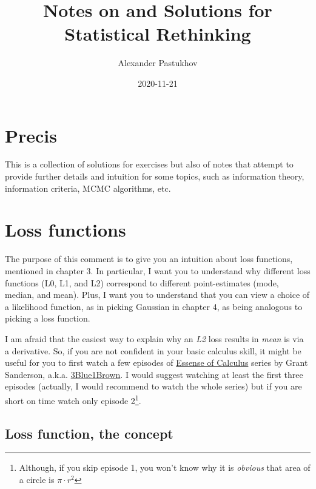 \documentclass[
]{book}
\title{Notes on and Solutions for Statistical Rethinking}
\author{Alexander Pastukhov}
\date{2020-11-21}
\begin{document}
\maketitle

{
\setcounter{tocdepth}{1}
\tableofcontents
}
\hypertarget{precis}{%
\chapter{Precis}\label{precis}}

This is a collection of solutions for exercises but also of notes that attempt to provide further details and intuition for some topics, such as information theory, information criteria, MCMC algorithms, etc.

\hypertarget{loss-functions}{%
\chapter{Loss functions}\label{loss-functions}}

The purpose of this comment is to give you an intuition about loss functions, mentioned in chapter 3. In particular, I want you to understand why different loss functions (L0, L1, and L2) correspond to different point-estimates (mode, median, and mean). Plus, I want you to understand that you can view a choice of a likelihood function, as in picking Gaussian in chapter 4, as being analogous to picking a loss function.

I am afraid that the easiest way to explain why an \emph{L2} loss results in \emph{mean} is via a derivative. So, if you are not confident in your basic calculus skill, it might be useful for you to first watch a few episodes of \href{https://www.youtube.com/playlist?list=PLZHQObOWTQDMsr9K-rj53DwVRMYO3t5Yr}{Essense of Calculus} series by Grant Sanderson, a.k.a. \href{https://www.3blue1brown.com/}{3Blue1Brown}. I would suggest watching at least the first three episodes (actually, I would recommend to watch the whole series) but if you are short on time watch only episode 2\footnote{Although, if you skip episode 1, you won't know why it is \emph{obvious} that area of a circle is \(\pi\cdot r^2\)}.

\hypertarget{loss-function-the-concept}{%
\section{Loss function, the concept}\label{loss-function-the-concept}}
\end{document}
